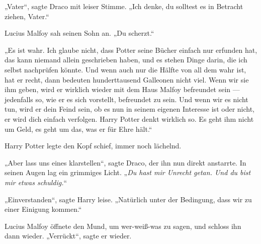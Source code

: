„Vater“, sagte Draco mit leiser Stimme.
„Ich denke, du solltest es in Betracht ziehen, Vater.“

Lucius Malfoy sah seinen Sohn an.
„Du scherzt.“

„Es ist wahr. Ich glaube nicht, dass Potter seine Bücher einfach nur erfunden hat, das kann niemand allein geschrieben haben, und es stehen Dinge darin, die ich selbst nachprüfen könnte. Und wenn auch nur die Hälfte von all dem wahr ist, hat er recht, dann bedeuten hunderttausend Galleonen nicht viel. Wenn wir sie ihm geben, wird er wirklich wieder mit dem Haus Malfoy befreundet sein — jedenfalls so, wie er es sich vorstellt, befreundet zu sein. Und wenn wir es nicht tun, wird er dein Feind sein, ob es nun in seinem eigenen Interesse ist oder nicht, er wird dich einfach verfolgen. Harry Potter denkt wirklich so. Es geht ihm nicht um Geld, es geht um das, was er für Ehre hält.“

Harry Potter legte den Kopf schief, immer noch lächelnd.

„Aber lass uns eines klarstellen“, sagte Draco, der ihn nun direkt anstarrte. In seinen Augen lag ein grimmiges Licht.
„\emph{Du hast mir Unrecht getan. \emph{Und} du bist mir etwas schuldig.}“

„Einverstanden“, sagte Harry leise.
„Natürlich unter der Bedingung, dass wir zu einer Einigung kommen.“

Lucius Malfoy öffnete den Mund, um wer-weiß-was zu sagen, und schloss ihn dann wieder.
„Verrückt“, sagte er wieder.

